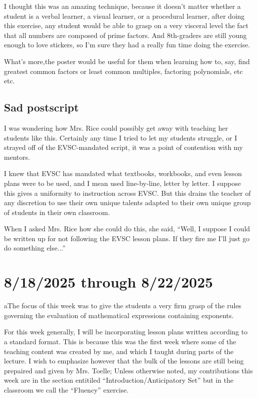 \documentclass[11pt]{elegantbook}
\begin{document}
I thought this was an amazing technique, because it doesn't matter
whether a student is a verbal learner, a visual learner, or a
procedural learner, after doing this exercise, any student would be
able to grasp on a very visceral level the fact that all numbers are
composed of prime factors.  And 8th-graders are still young enough to
love stickers, so I'm sure they had a really fun time doing the
exercise.

What's more,the poster would be useful for them when learning how to,
say, find greatest common factors or least common multiples, factoring
polynomials, etc etc.

\section*{Sad postscript}

I was wondering how Mrs. Rice could possibly get away with teaching
her students like this.  Certainly any time I tried to let my students
struggle, or I strayed off of the EVSC-mandated script, it was a point
of contention with my mentors.

I knew that EVSC has mandated what textbooks, workbooks, and even
lesson plans were to be used, and I mean used line-by-line, letter by
letter.  I suppose this gives a uniformity to instruction across
EVSC. But this drains the teacher of any discretion to use their own
unique talents adapted to their own unique group of students in their
own classroom.

When I asked Mrs. Rice how she could do this, she said, ``Well, I
suppose I could be written up for not following the EVSC lesson plans.
If they fire me I'll just go do something else...''


\chapter{8/18/2025 through 8/22/2025}

aThe focus of this week was to give the students a very firm grasp of
the rules governing the evaluation of mathematical expressions
containing exponents.

For this week generally, I will be incorporating lesson plans written
according to a standard format.  This is because this was the first
week where some of the teaching content was created by me, and which I
taught during parts of the lecture.  I wish to emphasize however that
the bulk of the lessons are still being prepaired and given by
Mrs. Toelle; Unless otherwise noted, my contributions this week are in
the section entitiled ``Introduction/Anticipatory Set'' but in the
classroom we call the ``Fluency'' exercise.
\end{document}
